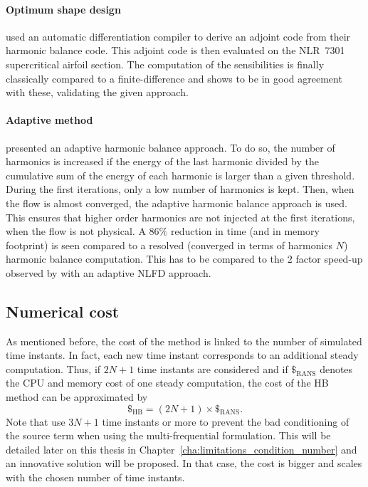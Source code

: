 \paragraph{Optimum shape design}
\citet{Thomas2005b} used an automatic 
differentiation compiler to derive an adjoint code
from their harmonic balance code. This adjoint code is then
evaluated on the NLR~7301 supercritical airfoil section.
The computation of the sensibilities is finally
classically compared to a finite-difference and shows
to be in good agreement with these, validating
the given approach.

\paragraph{Adaptive method}
\citet{Maple2004} presented an adaptive harmonic
balance approach. To do so, the number of harmonics is increased
if the energy of the last harmonic divided by the cumulative
sum of the energy of each harmonic is larger than a 
given threshold. During the first iterations, only
a low number of harmonics is kept. Then, when the flow
is almost converged, the adaptive harmonic balance
approach is used. This ensures that higher order harmonics
are not injected at the first iterations, when the
flow is not physical. A $86\%$ reduction in time (and
in memory footprint) is seen compared to a resolved (converged in
terms of harmonics $N$) harmonic
balance computation. This has to be compared to
the $2$ factor speed-up observed by \citet{Mosahebi2013}
with an adaptive NLFD approach.

\subsection{Numerical cost}
\label{sec:sm_hb_cost}
As mentioned before, the cost of the method is linked to
the number of simulated time instants.
In fact, each new time instant corresponds to an additional steady computation.
Thus, if \mbox{$2N+1$} time instants are considered and if $\mathdollar_{\text{RANS}}$ 
denotes the CPU and memory cost of
one steady computation, the cost of the HB method can be 
approximated by
\begin{equation}
	\mathdollar_{\text{HB}} = (2N+1) \times \mathdollar_{\text{RANS}}.
\end{equation}
Note that \citet{Ekici2007,Ekici2008a} use $3N+1$
time instants or more to prevent the bad conditioning of the
source term when using the multi-frequential formulation. 
This will be detailed later on this thesis in 
Chapter~\ref{cha:limitations_condition_number} and an innovative solution
will be proposed. In that
case, the cost is bigger and scales with the chosen number
of time instants.
